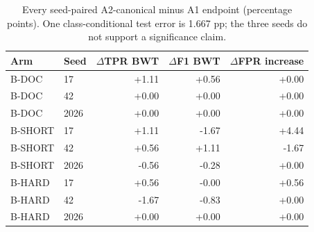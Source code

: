 \begin{table}[t]
\caption{Every seed-paired A2-canonical minus A1 endpoint (percentage points). One class-conditional test error is 1.667 pp; the three seeds do not support a significance claim.}
\label{tab:r4-stage-seeds}

\centering
\small
\setlength{\tabcolsep}{4pt}
\begin{tabular}{@{}llrrr@{}}
\toprule
Arm & Seed & $\Delta$TPR BWT & $\Delta$F1 BWT & $\Delta$FPR increase \\
\midrule
B-DOC & 17 & +1.11 & +0.56 & +0.00 \\
B-DOC & 42 & +0.00 & +0.00 & +0.00 \\
B-DOC & 2026 & +0.00 & +0.00 & +0.00 \\
B-SHORT & 17 & +1.11 & -1.67 & +4.44 \\
B-SHORT & 42 & +0.56 & +1.11 & -1.67 \\
B-SHORT & 2026 & -0.56 & -0.28 & +0.00 \\
B-HARD & 17 & +0.56 & -0.00 & +0.56 \\
B-HARD & 42 & -1.67 & -0.83 & +0.00 \\
B-HARD & 2026 & +0.00 & +0.00 & +0.00 \\
\bottomrule
\end{tabular}


\end{table}

